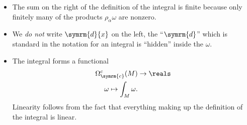\documentclass[fleqn]{NotesClass}
\renewcommand{\dl}{\symrm{d}}
\newcommand{\compact}{\symrm{c}}
\begin{document}
    \begin{remark}{}{}
        \begin{itemize}
            \item The sum on the right of the definition of the integral is finite because only finitely many of the products \(\rho_\alpha \omega\) are nonzero.
            \item We \emph{do not} write \(\dl{x}\) on the left, the \enquote{\(\dl\)} which is standard in the notation for an integral is \enquote{hidden} inside the \(\omega\).
            \item The integral forms a functional
            \begin{align}
                \Omega_{\compact}^c(M) &\to \reals\\
                \omega \mapsto \int_M \omega.
            \end{align}
            Linearity follows from the fact that everything making up the definition of the integral is linear.
        \end{itemize}
    \end{remark}
    
\end{document}
